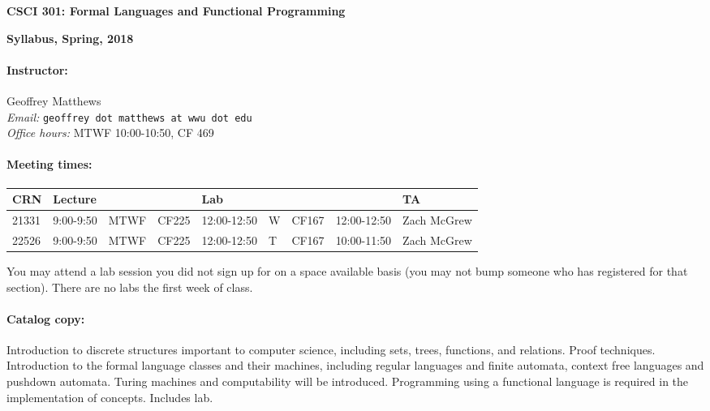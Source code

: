 \documentclass{article}
\begin{document}
\centerline{\Large\bf CSCI 301: Formal Languages and Functional Programming}
\centerline{\large\bf Syllabus, Spring, 2018}

\paragraph{Instructor:} Geoffrey Matthews\\
{\em Email:} {\tt geoffrey dot matthews at wwu dot edu}\\
{\em Office hours:} MTWF 10:00-10:50, CF 469

\paragraph{Meeting times:} \mbox{}

  \begin{tabular}{l|lll|llll|l}
    CRN & \multicolumn{3}{l|}{Lecture}
    & \multicolumn{3}{l}{Lab} && TA  \\\hline
    21331 & 9:00-9:50& MTWF & CF225& 12:00-12:50  & W & CF167& 12:00-12:50
    & Zach McGrew
\\
    22526 & 9:00-9:50& MTWF & CF225& 12:00-12:50  & T & CF167&  10:00-11:50 
    & Zach McGrew
    \\\hline
    \end{tabular}
	
  You  may attend a
  lab session you did not sign up for on a space available
  basis (you may not bump someone who has registered for
  that section).  There are no labs the first week of class.

\paragraph{Catalog copy:} Introduction to discrete structures important to
  computer science, including sets, trees, functions, and
  relations. Proof techniques. Introduction to the formal language
  classes and their machines, including regular languages and finite
  automata, context free languages and pushdown automata. Turing
  machines and computability will be introduced. Programming using a
  functional language is required in the implementation of
  concepts. Includes lab.
\end{document}
